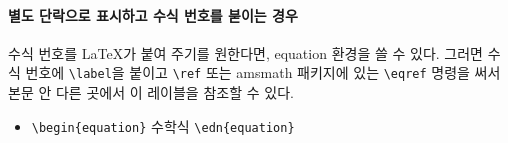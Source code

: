 \documentclass[12pt,a4paper]{report}
\begin{document}
	\paragraph{별도 단락으로 표시하고 수식 번호를 붇이는 경우}
	수식 번호를 \LaTeX 가 붙여 주기를 원한다면, equation 환경을 쓸 수 있다. 
	그러면 수식 번호에 \verb|\label|을 붙이고 \verb|\ref| 또는 
	amsmath  패키지에 있는 \verb|\eqref| 명령을 써서 본문 안 다른 곳에서 이 레이블을 참조할 수 있다.

	\begin{itemize}
	\item 	\verb|\begin{equation}| 수학식 \verb|\edn{equation}|
	\end{itemize}


%
%
%
\clearpage
\end{document}
